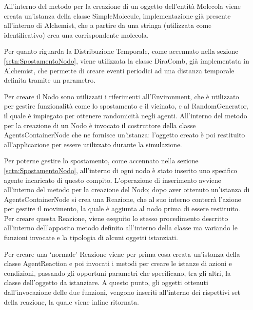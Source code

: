 All'interno del metodo per la creazione di un oggetto dell'entità Molecola viene creata un'istanza della classe SimpleMolecule, implementazione già presente all'interno di Alchemist, che a partire da una stringa (utilizzata come identificativo) crea una corrispondente molecola.

Per quanto riguarda la Distribuzione Temporale, come accennato nella sezione \ref{sctn:SpostamentoNodo}, viene utilizzata la classe DiraComb, già implementata in Alchemist, che permette di creare eventi periodici ad una distanza temporale definita tramite un parametro.

Per creare il Nodo sono utilizzati i riferimenti all'Environment, che è utilizzato per gestire funzionalità come lo spostamento e il vicinato, e al RandomGenerator, il quale è impiegato per ottenere randomicità negli agenti. All'interno del metodo per la creazione di un Nodo è invocato il costruttore della classe AgentsContainerNode che ne fornisce un'istanza: l'oggetto creato è poi restituito all'applicazione per essere utilizzato durante la simulazione.

Per poterne gestire lo spostamento, come accennato nella sezione \ref{sctn:SpostamentoNodo}, all'interno di ogni nodo è stato inserito uno specifico agente incaricato di questo compito. L'operazione di inserimento avviene all'interno del metodo per la creazione del Nodo; dopo aver ottenuto un'istanza di AgentsContainerNode si crea una Reazione, che al suo interno conterrà l'azione per gestire il movimento, la quale è aggiunta al nodo prima di essere restituito.
%
Per creare questa Reazione, viene eseguito lo stesso procedimento descritto all'interno dell'apposito metodo definito all'interno della classe ma variando le funzioni invocate e la tipologia di alcuni oggetti istanziati.

Per creare una `normale' Reazione viene per prima cosa creata un'istanza della classe AgentReaction e poi invocati i metodi per creare le istanze di azioni e condizioni, passando gli opportuni parametri che specificano, tra gli altri, la classe dell'oggetto da istanziare. A questo punto, gli oggetti ottenuti dall'invocazione delle due funzioni, vengono inseriti all'interno dei rispettivi set della reazione, la quale viene infine ritornata.

